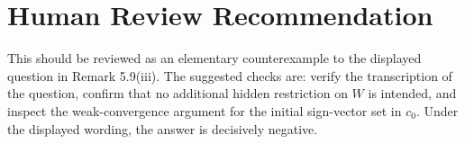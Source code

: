 \documentclass[11pt]{article}
\begin{document}
\section*{Human Review Recommendation}

This should be reviewed as an elementary counterexample to the displayed
question in Remark 5.9(iii).  The suggested checks are: verify the
transcription of the question, confirm that no additional hidden
restriction on \(W\) is intended, and inspect the weak-convergence
argument for the initial sign-vector set in \(c_0\).  Under the displayed
wording, the answer is decisively negative.
\end{document}
